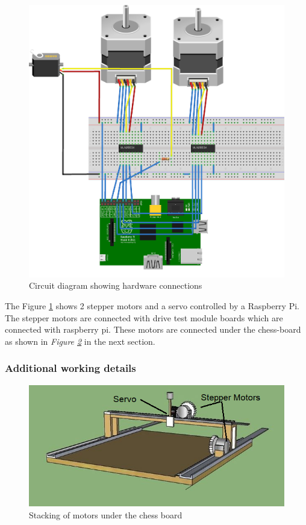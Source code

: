 \documentclass[a4paper,12pt]{article}
\begin{document}
{\begin{figure}[h!]
    \includegraphics[scale = 0.2]{Circuit_Diagram_Chess.png}
    \caption{Circuit diagram showing hardware connections}
    \label{fig:ckt_dig}
\end{figure}

	The Figure \ref{fig:ckt_dig} shows 2 stepper motors and a servo controlled by a Raspberry Pi. The stepper motors are connected with drive test module boards which are connected with raspberry pi. These motors are connected under the chess-board as shown in \textit{Figure \ref{fig:motors}} in the next section.

\newpage
\subsubsection{Additional working details}
\begin{figure}[h!]
    \centering
    \includegraphics[scale = 0.7]{Chess_Hand.png}
    \caption{Stacking of motors under the chess board}
    \label{fig:motors}
\end{figure}

}
\end{document}
